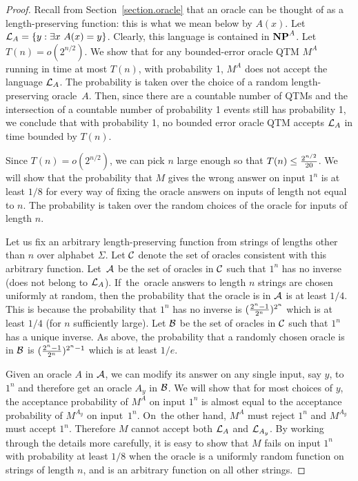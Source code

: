 \begin{proof}
Recall from Section~\ref{section.oracle} that an oracle can
be thought of as a length-preserving function: this is what
we mean below by $A(x)$.
Let ${\cal L}_A = \{y: \exists x ~ A(x) = y\}$.
Clearly, this language is contained in $\mbox{\bf NP}^A$.
Let $T(n) = o(2^{n/2})$. We show that for any
bounded-error oracle QTM $M^A$ running in time at most $T(n)$,
with probability 1, $M^A$ does not accept the language ${\cal L}_A$.
The probability is taken over the choice of a random length-preserving
oracle~$A$.
Then, since there are a countable number of QTMs
and the intersection of a countable number of probability 1 events
still has probability 1, we conclude that with probability 1,
no bounded error oracle
QTM accepts ${\cal L}_A$ in time bounded by $T(n)$.

Since $T(n) = o(2^{n/2})$, we can pick $n$ large enough so that
$T(n) \leq {2^{n/2} \over 20}$.
We will show that the probability
that $M$ gives the wrong answer on input $1^n$ is at least
$1/8$ for every way of fixing the oracle answers on
inputs of length not equal to $n$. The probability is taken over
the random choices of the oracle for inputs of length $n$.

Let us fix an arbitrary length-preserving function from strings of lengths
other than $n$ over alphabet $\Sigma$. Let ${\cal C}$
denote the set of oracles consistent with this arbitrary
function. Let~${\cal A}$ be the set of oracles in ${\cal C}$ such that $1^n$
has no inverse (does not belong to ${\cal L}_A$). If~the~oracle
answers to length $n$ strings are chosen uniformly at random,
then the probability that the oracle is in ${\cal A}$ is at least
$1/4$. This is because the probability that $1^n$ has no
inverse is $({2^n - 1 \over
2^n})^{2^n}$ which is at least $1/4$ (for $n$ sufficiently large).
Let ${\cal B}$ be
the set of oracles in ${\cal C}$ such that $1^n$ has a unique inverse.
As above, the probability that a randomly chosen oracle
is in ${\cal B}$ is
$({2^n - 1 \over 2^n})^{2^n-1}$ which is at least $1/e$.

Given an oracle $A$ in ${\cal A}$, we can modify its answer
on any single input, say $y$, to $1^n$ and therefore get an oracle $A_y$
in ${\cal B}$. We will show that for most choices of $y$, the
acceptance probability of $M^A$ on input $1^n$ is almost equal to
the acceptance probability of $M^{A_y}$ on input~$1^n$. On~the other
hand, $M^A$ must reject $1^n$ and $M^{A_y}$ must accept $1^n$. Therefore
$M$ cannot accept both ${\cal L}_A$ and ${\cal L}_{A_y}$. By
working through the details more carefully, it is easy to show that $M$ fails
on input $1^n$ with probability at least $1/8$ when the
oracle is a uniformly random function on strings of length $n$,
and is an arbitrary function on all other strings.


\end{proof}
